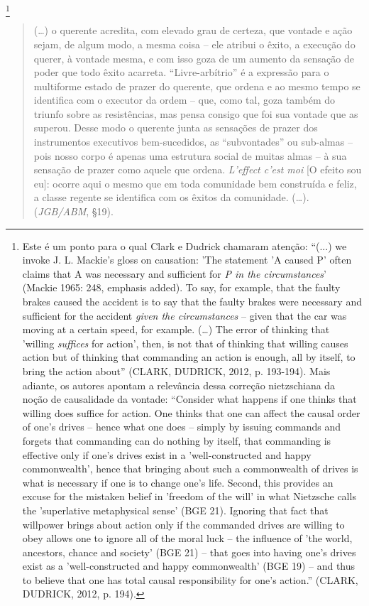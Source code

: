 \documentclass[
	12pt,				%
	openright,			%
	oneside,			%
	a4paper,			%
	english,			%
	french,				%
	spanish,			%
	brazil				%
	]{abntex2}
\begin{document}
\footnote{Este é um ponto para o qual Clark e Dudrick chamaram atenção: “(...) we invoke J. L. Mackie's gloss on causation: 'The statement 'A caused P' often claims that A was necessary and sufficient for \textit{P in the circumstances}' (Mackie 1965: 248, emphasis added). To say, for example, that the faulty brakes caused the accident is to say that the faulty brakes were necessary and sufficient for the accident \textit{given the circumstances} – given that the car was moving at a certain speed, for example. (…) The error of thinking that 'willing \textit{suffices} for action', then, is not that of thinking that willing causes action but of thinking that commanding an action is enough, all by itself, to bring the action about” (CLARK, DUDRICK, 2012, p. 193-194). Mais adiante, os autores apontam a relevância dessa correção nietzschiana da noção de causalidade da vontade: “Consider what happens if one thinks that willing does suffice for action. One thinks that one can affect the causal order of one's drives – hence what one does – simply by issuing commands and forgets that commanding can do nothing by itself, that commanding is effective only if one's drives exist in a 'well-constructed and happy commonwealth', hence that bringing about such a commonwealth of drives is what is necessary if one is to change one's life. Second, this provides an excuse for the mistaken belief in 'freedom of the will' in what Nietzsche calls the 'superlative metaphysical sense' (BGE 21). Ignoring that fact that willpower brings about action only if the commanded drives are willing to obey allows one to ignore all of the moral luck – the influence of 'the world, ancestors, chance and society' (BGE 21) – that goes into having one's drives exist as a 'well-constructed and happy commonwealth' (BGE 19) – and thus to believe that one has total causal responsibility for one's action.” (CLARK, DUDRICK, 2012, p. 194). } 

\begin{quotation}
(…) o querente acredita, com elevado grau de certeza, que vontade e ação sejam, de algum modo, a mesma coisa – ele atribui o êxito, a execução do querer, à vontade mesma, e com isso goza de um aumento da sensação de poder que todo êxito acarreta. “Livre-arbítrio” é a expressão para o multiforme estado de prazer do querente, que ordena e ao mesmo tempo se identifica com o executor da ordem – que, como tal, goza também do triunfo sobre as resistências, mas pensa consigo que foi sua vontade que as superou. Desse modo  o querente junta as sensações de prazer dos instrumentos executivos bem-sucedidos, as “subvontades” ou sub-almas – pois nosso corpo é apenas uma estrutura social de muitas almas – à sua sensação de prazer como aquele que ordena. \textit{L'effect c'est moi} [O efeito sou eu]: ocorre aqui o mesmo que em toda comunidade bem construída e feliz, a classe regente se identifica com os êxitos da comunidade. (…). (\textit{JGB/ABM}, §19).
\end{quotation}
\end{document}

